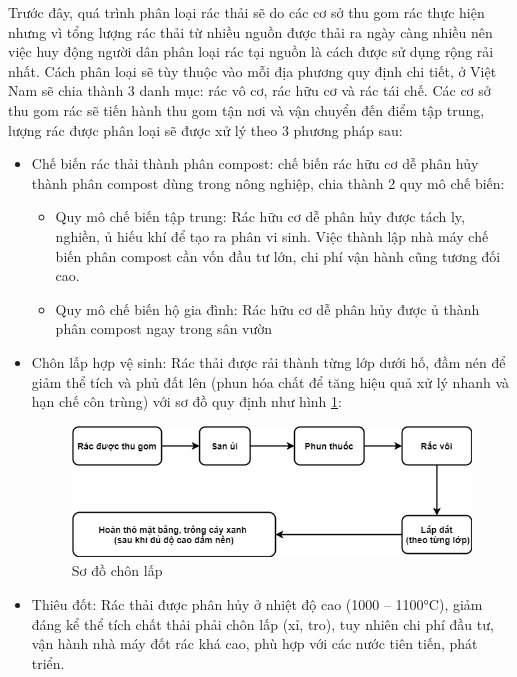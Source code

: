 Trước đây, quá trình phân loại rác thải sẽ do các cơ sở thu gom rác thực hiện nhưng vì tổng lượng rác thải từ nhiều nguồn được thải ra ngày càng nhiều nên việc huy động người dân phân loại rác tại nguồn là cách được sử dụng rộng rải nhất. Cách phân loại sẽ tùy thuộc vào mỗi địa phương quy định chi tiết, ở Việt Nam sẽ chia thành 3 danh mục: rác vô cơ, rác hữu cơ và rác tái chế. Các cơ sở thu gom rác sẽ tiến hành thu gom tận nơi và vận chuyển đến điểm tập trung, lượng rác được phân loại sẽ được xử lý theo 3 phương pháp sau:
\begin{itemize}
    \item Chế biến rác thải thành phân compost: chế biến rác hữu cơ dễ phân hủy thành phân compost dùng trong nông nghiệp, chia thành 2 quy mô chế biến:
        \begin{itemize}
            \item Quy mô chế biến tập trung: Rác hữu cơ dễ phân hủy được tách ly, nghiền, ủ hiếu khí để tạo ra phân vi sinh. Việc thành lập nhà máy chế biến phân compost cần vốn đầu tư lớn, chi phí vận hành cũng tương đối cao.
            \item  Quy mô chế biến hộ gia đình: Rác hữu cơ dễ phân hủy được ủ thành phân compost ngay trong sân vườn
        \end{itemize}

    \item Chôn lấp hợp vệ sinh: Rác thải được rải thành từng lớp dưới hố, đầm nén để giảm thể tích và phủ đất lên (phun  hóa chất để tăng hiệu quả xử lý nhanh và hạn chế côn trùng) với sơ đồ quy định như hình \ref{fig:so_do_chon_lap}:
    
        \begin{figure}[H]
            \centering            
            \includegraphics[width=\textwidth]{images/SoDoChonLap.png}
            \caption{Sơ đồ chôn lấp}
            \label{fig:so_do_chon_lap}
        \end{figure}

    \item Thiêu đốt: Rác thải được phân hủy ở nhiệt độ cao (1000 – 1100°C), giảm đáng kể thể tích chất thải phải chôn lấp (xỉ, tro), tuy nhiên chi phí đầu tư, vận hành nhà máy đốt rác khá cao, phù hợp với các nước tiên tiến, phát triển. 
   

\end{itemize}
